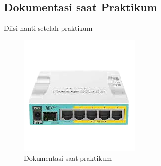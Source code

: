 \subsection{Dokumentasi saat Praktikum}
Diisi nanti setelah praktikum
\begin{figure}[H]
	\centering
	\includegraphics[width=0.75\linewidth]{P1/img/contoh.png}
	\caption{Dokumentasi saat praktikum}
	\label{fig:gambar32}
\end{figure}